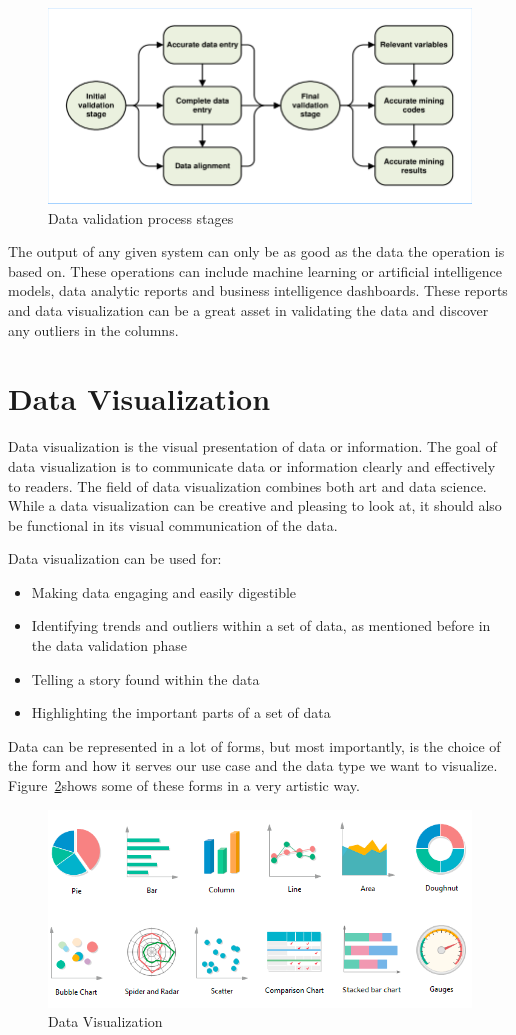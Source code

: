 \begin{figure}[H]
\centering
\includegraphics[width=15cm]{validation}
\caption{Data validation process stages\cite{okeowo2018investigating}}
\label{fig:validation}
\end{figure}

The output of any given system can only be as good as the data the operation is based on. These operations can include machine learning or artificial intelligence models, data analytic reports and business intelligence dashboards. These reports and data visualization can be a great asset in validating the data and discover any outliers in the columns.

\section{Data Visualization}
Data visualization is the visual presentation of data or information. The goal of data visualization is to communicate data or information clearly and effectively to readers. The field of data visualization combines both art and data science. While a data visualization can be creative and pleasing to look at, it should also be functional in its visual communication of the data.

Data visualization can be used for:
\begin{itemize}
\item Making data engaging and easily digestible
\item Identifying trends and outliers within a set of data, as mentioned before in the data validation phase
\item Telling a story found within the data
\item Highlighting the important parts of a set of data
\end{itemize}

Data can be represented in a lot of forms, but most importantly, is the choice of the form and how it serves our use case and the data type we want to visualize. Figure~\ref{fig:charts}shows some of these forms in a very artistic way.

\begin{figure}[H]
\centering
\includegraphics[width=15cm]{charts}
\caption{Data Visualization\cite{Sdhglobal_2023}}
\label{fig:charts}
\end{figure}